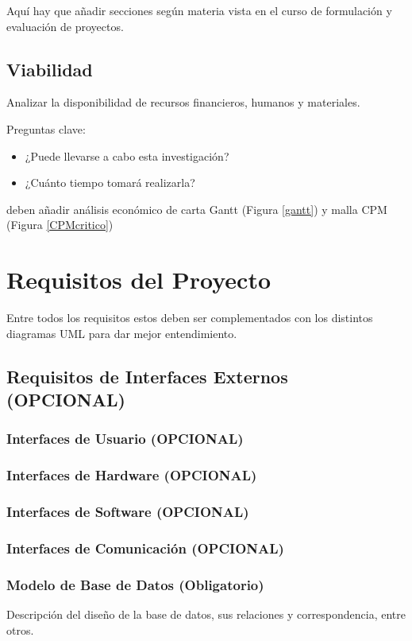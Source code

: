 \documentclass[letter,12pt]{report}
\newcommand\rojo[1]{\textcolor[rgb]{1,0,0}{#1}}
\begin{document}
Aquí hay que añadir secciones según materia vista en el curso de formulación y evaluación de proyectos.

\section{Viabilidad}
Analizar la disponibilidad de recursos financieros, humanos y materiales.

Preguntas clave:
  \begin{itemize}\justifying
  \item ¿Puede llevarse a cabo esta investigación?
  \item ¿Cuánto tiempo tomará realizarla?
\end{itemize}

deben añadir análisis económico de carta Gantt (Figura \ref{gantt}) y malla CPM (Figura \ref{CPMcritico})




\chapter{Requisitos del Proyecto}\label{requisitos}
Entre todos los requisitos estos deben ser complementados con los distintos diagramas UML para dar mejor entendimiento.
\section{Requisitos de Interfaces Externos (\rojo{OPCIONAL})}
\subsection{Interfaces de Usuario (\rojo{OPCIONAL})}
\subsection{Interfaces de Hardware (\rojo{OPCIONAL})}
\subsection{Interfaces de Software (\rojo{OPCIONAL})}
\subsection{Interfaces de Comunicación (\rojo{OPCIONAL})}


\subsection{Modelo de Base de Datos (\rojo{Obligatorio})}
Descripción del diseño de la base de datos, sus relaciones y correspondencia, entre otros.
\end{document}
